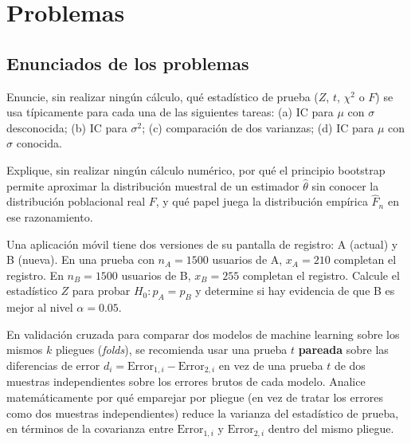 \section*{Problemas}

\subsection*{Enunciados de los problemas}

\begin{problema}
	\label{prob:9f56f56}
	Enuncie, sin realizar ningún cálculo, qué estadístico de prueba ($Z$, $t$, $\chi^2$ o $F$) se usa típicamente para cada una de las siguientes tareas: (a) IC para $\mu$ con $\sigma$ desconocida; (b) IC para $\sigma^2$; (c) comparación de dos varianzas; (d) IC para $\mu$ con $\sigma$ conocida.
\end{problema}

\begin{problema}
	\label{prob:56afb0b}
	Explique, sin realizar ningún cálculo numérico, por qué el principio bootstrap permite aproximar la distribución muestral de un estimador $\hat\theta$ sin conocer la distribución poblacional real $F$, y qué papel juega la distribución empírica $\hat F_n$ en ese razonamiento.
\end{problema}

\begin{problema}
	\label{prob:f78153c}
	Una aplicación móvil tiene dos versiones de su pantalla de registro: A (actual) y B (nueva). En una prueba con $n_A=1500$ usuarios de A, $x_A=210$ completan el registro. En $n_B=1500$ usuarios de B, $x_B=255$ completan el registro. Calcule el estadístico $Z$ para probar $H_0: p_A=p_B$ y determine si hay evidencia de que B es mejor al nivel $\alpha=0.05$.
\end{problema}

\begin{problema}
	\label{prob:4d90cdd}
	En validación cruzada para comparar dos modelos de machine learning sobre los mismos $k$ pliegues (\emph{folds}), se recomienda usar una prueba $t$ \textbf{pareada} sobre las diferencias de error $d_i = \text{Error}_{1,i}-\text{Error}_{2,i}$ en vez de una prueba $t$ de dos muestras independientes sobre los errores brutos de cada modelo. Analice matemáticamente por qué emparejar por pliegue (en vez de tratar los errores como dos muestras independientes) reduce la varianza del estadístico de prueba, en términos de la covarianza entre $\text{Error}_{1,i}$ y $\text{Error}_{2,i}$ dentro del mismo pliegue.
\end{problema}

